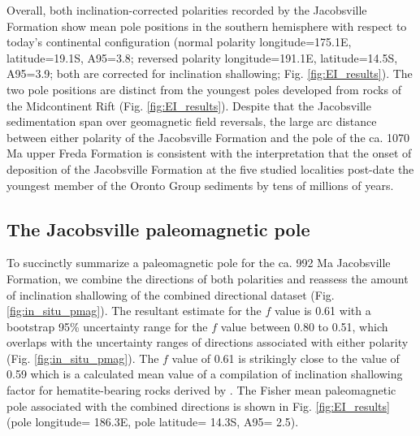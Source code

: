 \documentclass[draft]{agujournal2019}
\begin{document}
Overall, both inclination-corrected polarities recorded by the Jacobsville Formation show mean pole positions in the southern hemisphere with respect to today's continental configuration (normal polarity longitude=175.1\textdegree E, latitude=19.1\textdegree S, A95=3.8\textdegree; reversed polarity longitude=191.1\textdegree E, latitude=14.5\textdegree S, A95=3.9\textdegree; both are corrected for inclination shallowing; Fig. \ref{fig:EI_results}). The two pole positions are distinct from the youngest poles developed from rocks of the Midcontinent Rift (Fig. \ref{fig:EI_results}). Despite that the Jacobsville sedimentation span over geomagnetic field reversals, the large arc distance between either polarity of the Jacobsville Formation and the pole of the ca. 1070 Ma upper Freda Formation is consistent with the interpretation that the onset of deposition of the Jacobsville Formation at the five studied localities post-date the youngest member of the Oronto Group sediments by tens of millions of years. 

\subsection*{The Jacobsville paleomagnetic pole}
To succinctly summarize a paleomagnetic pole for the ca. 992 Ma Jacobsville Formation, we combine the directions of both polarities and reassess the amount of inclination shallowing of the combined directional dataset (Fig. \ref{fig:in_situ_pmag}). The resultant estimate for the $f$ value is 0.61 with a bootstrap 95\% uncertainty range for the $f$ value between 0.80 to 0.51, which overlaps with the uncertainty ranges of directions associated with either polarity (Fig. \ref{fig:in_situ_pmag}). The $f$ value of 0.61 is strikingly close to the value of 0.59 which is a calculated mean value of a compilation of inclination shallowing factor for hematite-bearing rocks derived by \cite{Bilardello2010b}. The Fisher mean paleomagnetic pole associated with the combined directions is shown in Fig. \ref{fig:EI_results} (pole longitude= 186.3\textdegree E, pole latitude= 14.3\textdegree S, A95= 2.5\textdegree). 
\end{document}
